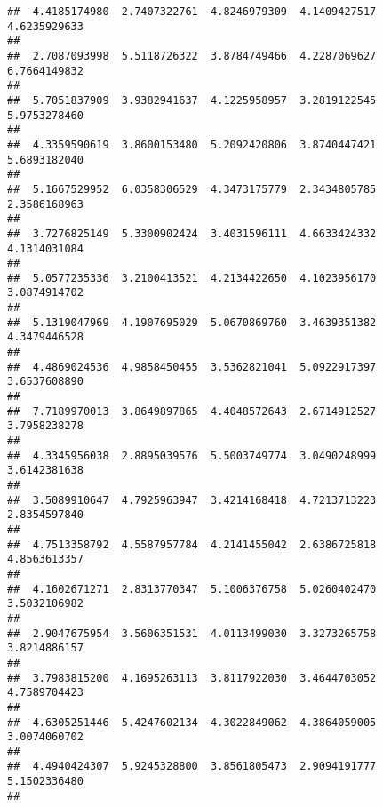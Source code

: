 \documentclass[]{article}
\begin{document}
\begin{verbatim}
##  4.4185174980  2.7407322761  4.8246979309  4.1409427517  4.6235929633 
##                                                                       
##  2.7087093998  5.5118726322  3.8784749466  4.2287069627  6.7664149832 
##                                                                       
##  5.7051837909  3.9382941637  4.1225958957  3.2819122545  5.9753278460 
##                                                                       
##  4.3359590619  3.8600153480  5.2092420806  3.8740447421  5.6893182040 
##                                                                       
##  5.1667529952  6.0358306529  4.3473175779  2.3434805785  2.3586168963 
##                                                                       
##  3.7276825149  5.3300902424  3.4031596111  4.6633424332  4.1314031084 
##                                                                       
##  5.0577235336  3.2100413521  4.2134422650  4.1023956170  3.0874914702 
##                                                                       
##  5.1319047969  4.1907695029  5.0670869760  3.4639351382  4.3479446528 
##                                                                       
##  4.4869024536  4.9858450455  3.5362821041  5.0922917397  3.6537608890 
##                                                                       
##  7.7189970013  3.8649897865  4.4048572643  2.6714912527  3.7958238278 
##                                                                       
##  4.3345956038  2.8895039576  5.5003749774  3.0490248999  3.6142381638 
##                                                                       
##  3.5089910647  4.7925963947  3.4214168418  4.7213713223  2.8354597840 
##                                                                       
##  4.7513358792  4.5587957784  4.2141455042  2.6386725818  4.8563613357 
##                                                                       
##  4.1602671271  2.8313770347  5.1006376758  5.0260402470  3.5032106982 
##                                                                       
##  2.9047675954  3.5606351531  4.0113499030  3.3273265758  3.8214886157 
##                                                                       
##  3.7983815200  4.1695263113  3.8117922030  3.4644703052  4.7589704423 
##                                                                       
##  4.6305251446  5.4247602134  4.3022849062  4.3864059005  3.0074060702 
##                                                                       
##  4.4940424307  5.9245328800  3.8561805473  2.9094191777  5.1502336480 
##                                                                       

\end{verbatim}
\end{document}

